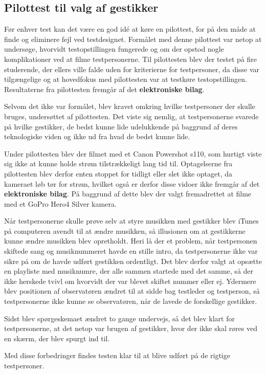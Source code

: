 \subsection{Pilottest til valg af gestikker}
\label{PilottestValgAfGestikker}
Før enhver test kan det være en god idé at køre en pilottest, for på den måde at finde og eliminere fejl ved testdesignet. Formålet med denne pilottest var netop at undersøge, hvorvidt testopstillingen fungerede og om der opstod nogle komplikationer ved at filme testpersonerne. Til pilottesten blev der testet på fire studerende, der ellers ville falde uden for kriterierne for testpersoner, da disse var tilgængelige og at hovedfokus med pilottesten var at testkøre testopstillingen. Resultaterne fra pilottesten fremgår af det \textbf{elektroniske bilag}. 

Selvom det ikke var formålet, blev kravet omkring hvilke testpersoner der skulle bruges, undersøttet af pilottesten. Det viste sig nemlig, at testpersonerne svarede på hvilke gestikker, de bedst kunne lide udelukkende på baggrund af deres teknologiske viden og ikke ud fra hvad de bedst kunne lide.  

Under pilottesten blev der filmet med et Canon Powershot s110, som hurtigt viste sig ikke at kunne holde strøm tilstrækkeligt lang tid til. Optagelserne fra pilottesten blev derfor enten stoppet for tidligt eller slet ikke optaget, da kameraet løb tør for strøm, hvilket også er derfor disse vidoer ikke fremgår af det \textbf{elektroniske bilag}. På baggrund af dette blev der valgt fremadrettet at filme med et GoPro Hero4 Silver kamera. 

Når testpersonerne skulle prøve selv at styre musikken med gestikker blev iTunes på computeren avendt til at ændre musikken, så illusionen om at gestikkerne kunne ændre musikken blev opretholdt. Heri lå der et problem, når testpersonen skiftede sang og musiknummeret havde en stille intro, da testpersonerne ikke var sikre på om de havde udført gestikken ordentligt. Det blev derfor valgt at opsætte en playliste med musiknumre, der alle sammen startede med det samme, så der ikke herskede tvivl om hvorvidt der var blevet skiftet nummer eller ej. Ydermere blev positionen af observatøren ændret til at sidde bag testleder og testperson, så testpersonerne ikke kunne se observatøren, når de lavede de forskellige gestikker. 

Sidst blev spørgeskemaet ændret to gange undervejs, så det blev klart for testpersonerne, at det netop var brugen af gestikker, hvor der ikke skal røres ved en skærm, der blev spurgt ind til. 

Med disse forbedringer findes testen klar til at blive udført på de rigtige testpersoner. 